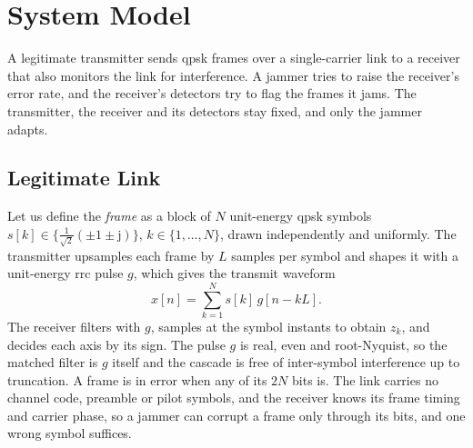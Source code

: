 \section{System Model} \label{sec:sysmodel}

A legitimate transmitter sends \ac{qpsk} frames over a single-carrier link to a receiver that also monitors the link for interference.
A jammer tries to raise the receiver's error rate, and the receiver's detectors try to flag the frames it jams.
The transmitter, the receiver and its detectors stay fixed, and only the jammer adapts.

\subsection{Legitimate Link} \label{sec:sysmodel:link}
Let us define the \textit{frame} as a block of $N$ unit-energy \ac{qpsk} symbols $s[k]\in\{\tfrac{1}{\sqrt2}(\pm1\pm\mathrm{j})\}$, $k\in\{1,\ldots,N\}$, drawn independently and uniformly.
The transmitter upsamples each frame by $L$ samples per symbol and shapes it with a unit-energy \ac{rrc} pulse $g$, which gives the transmit waveform
\begin{equation}
x[n]=\sum_{k=1}^{N} s[k]\,g[n-kL].
\label{eq:tx}
\end{equation}
The receiver filters with $g$, samples at the symbol instants to obtain $z_k$, and decides each axis by its sign.
The pulse $g$ is real, even and root-Nyquist, so the matched filter is $g$ itself and the cascade is free of inter-symbol interference up to truncation.
A frame is in error when any of its $2N$ bits is.
The link carries no channel code, preamble or pilot symbols, and the receiver knows its frame timing and carrier phase, so a jammer can corrupt a frame only through its bits, and one wrong symbol suffices.

